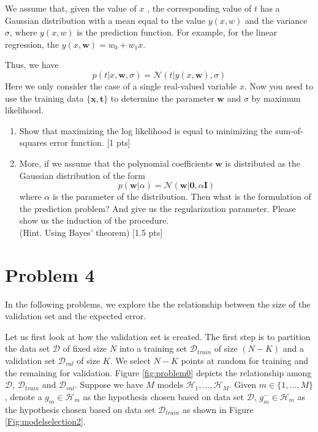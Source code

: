 \documentclass[10pt]{article}
\renewcommand{\mathbf}{\boldsymbol}
\begin{document}
We assume that, given the value of $x$ , the corresponding value of $t$ has a Gaussian distribution with a mean equal to the value $y(x,w)$ and the variance $\sigma$, where $y(x,w)$ is the prediction function. For example, for the linear regression, the $y(x,\mathbf{w}) = w_0+w_1x$.

Thus, we have 
\begin{equation}
    p(t|x,\mathbf{w}, \sigma) = \mathcal{N}(t|y(x,\mathbf{w}),\sigma)
\end{equation}
Here we only consider the case of a single real-valued variable $x$.
Now  you need  to use the training data $\{\mathbf{x},\mathbf{t}\}$ to determine the parameter $\mathbf{w}$ and $\sigma$ by maximum likelihood. 
\begin{enumerate}
	\item Show that maximizing the log likelihood is equal to minimizing the sum-of-squares error function. {\color{red} [1 pts]}
	\item More, if we assume that the polynomial coefficients $\mathbf{w}$ is distributed as the Gaussian distribution of the form
	\begin{equation}
	    p(\mathbf{w}|\alpha) =  \mathcal{N}(\mathbf{w}|\mathbf{0},\alpha \mathbf{I})
	\end{equation}
	where $\alpha$ is the parameter of the distribution.
	Then what is the formulation of the prediction problem?  And give us the regularization parameter. Please show us the induction of the procedure.\\
	(Hint. Using Bayes' theorem) {\color{red} [1.5 pts]}
\end{enumerate}


\section*{Problem 4}
In the following problems, we explore the the relationship between the size of the validation set and the expected error. 

Let us first look at how the validation set is created. The first step is
to partition the data set $\mathcal{D}$ of fixed size $N$ into a training set $\mathcal{D}_{train}$ of size $(N-K)$ and a validation set $\mathcal{D}_{val}$ of size $K$. We select $N-K$ points at random for training and the remaining for validation. Figure \ref{fig:problem0} depicts the relationship among $\mathcal{D}$, $\mathcal{D}_{train}$ and $\mathcal{D}_{val}$.
Suppose we have $M$ models $\mathcal{H}_1,\dots,\mathcal{H}_M$. Given $m\in\{1,\dots,M\}$, denote a  $g_m\in\mathcal{H}_m$ as the hypothesis chosen based on data set $\mathcal{D}$,  $g_m^-\in\mathcal{H}_m$ as the hypothesis chosen based on data set $\mathcal{D}_{train}$ as shown in Figure \ref{Fig:modelselection2}.
\end{document}
